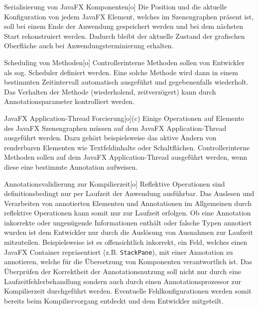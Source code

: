 \begin{freq}{Serialisierung von JavaFX Komponenten}[o]
	Die Position und die aktuelle Konfiguration von jedem JavaFX Element, welches im Szenengraphen präsent ist, soll bei einem Ende der Anwendung gespeichert werden und bei dem nächsten Start rekonstruiert werden. Dadurch bleibt der aktuelle Zustand der grafischen Oberfläche auch bei Anwendungsterminierung erhalten.
\end{freq}
\begin{freq}{Scheduling von Methoden}[o]
	Controllerinterne Methoden sollen von Entwickler als sog. Scheduler definiert werden. Eine solche Methode wird dann in einem bestimmten Zeitintervall automatisch ausgeführt und gegebenenfalls wiederholt. Das Verhalten der Methode (wiederholend, zeitverzögert) kann durch Annotationsparameter kontrolliert werden.
\end{freq}
\begin{freq}{JavaFX Application-Thread Forcierung}[o](c)
	Einige Operationen auf Elemente des JavaFX Szenengraphen müssen auf dem JavaFX Application-Thread ausgeführt werden. Dazu gehört beispielsweise das aktive Ändern von renderbaren Elementen wie Textfeldinhalte oder Schaltflächen. Controllerinterne Methoden sollen auf dem JavaFX Application-Thread ausgeführt werden, wenn diese eine bestimmte Annotation aufweisen.
\end{freq}
\begin{freq}{Annotationsvalidierung zur Kompilierzeit}[o]
	Reflektive Operationen sind definitionsbedingt nur per Laufzeit der Anwendung ausführbar. Das Auslesen und Verarbeiten von annotierten Elementen und Annotationen im Allgemeinen durch reflektive Operationen kann somit nur zur Laufzeit erfolgen. Ob eine Annotation inkorrekte oder ungenügende Informationen enthält oder falsche Typen annotiert wurden ist dem Entwickler nur durch die Auslösung von Ausnahmen zur Laufzeit mitzuteilen. Beispielsweise ist es offensichtlich inkorrekt, ein Feld, welches einen JavaFX Container repräsentiert (z.B. \texttt{StackPane}), mit einer Annotation zu annotieren, welche für die Übersetzung von Komponenten verantwortlich ist. Das Überprüfen der Korrektheit der Annotationsnutzung soll nicht nur durch eine Laufzeitfehlerbehandlung sondern auch durch einen Annotationsprozessor zur Kompilierzeit durchgeführt werden. Eventuelle Fehlkonfigurationen werden somit bereits beim Kompiliervorgang entdeckt und dem Entwickler mitgeteilt.
\end{freq}
